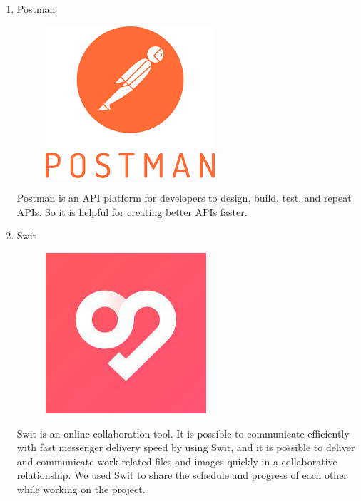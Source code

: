 \documentclass[conference]{IEEEtran}
\begin{document}
\begin{enumerate}
\begin{enumerate}
        \item Postman\\
        \begin{figure}[H]
                 \centering
                 \includegraphics[scale=0.3]{new_assets/postman-logo.png}
                 \end{figure}
        Postman is an API platform for developers to design, build, test, and repeat APIs. So it is helpful for creating better APIs faster.
        \item Swit\\
        \begin{figure}[H]
                 \centering
                 \includegraphics[scale=0.2]{new_assets/swit-logo.jpg}
                 \end{figure}
        Swit is an online collaboration tool. It is possible to communicate efficiently with fast messenger delivery speed by using Swit, and it is possible to deliver and communicate work-related files and images quickly in a collaborative relationship. We used Swit to share the schedule and progress of each other while working on the project.
    \end{enumerate}
    \end{enumerate}
    
\end{document}
